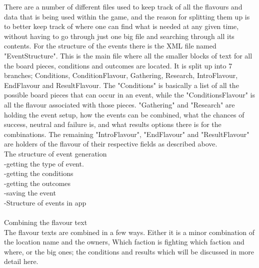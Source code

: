There are a number of different files used to keep track of all the flavours and data that is being used within the game, and the reason for splitting them up is to better keep track of where one can find what is needed at any given time, without having to go through just one big file and searching through all its contents.
For the structure of the events there is the XML file named "EventStructure". This is the main file where all the smaller blocks of text for all the board pieces, conditions and outcomes are located. It is split up into 7 branches; Conditions, ConditionFlavour, Gathering, Research, IntroFlavour, EndFlavour and ResultFlavour.
The "Conditions" is basically a list of all the possible board pieces that can occur in an event, while the "ConditionsFlavour" is all the flavour associated with those pieces.
"Gathering" and "Research" are holding the event setup, how the events can be combined, what the chances of success, neutral and failure is, and what results options there is for the combinations.
The remaining "IntroFlavour", "EndFlavour" and "ResultFlavour" are holders of the flavour of their respective fields as described above.\\




The structure of event generation\\
-getting the type of event.\\
-getting the conditions\\
-getting the outcomes\\
-saving the event\\
-Structure of events in app\\\\

Combining the flavour text\\

The flavour texts are combined in a few ways. Either it is a minor combination of the location name and the owners, Which faction is fighting which faction and where, or the big ones; the conditions and results which will be discussed in more detail here.\\

